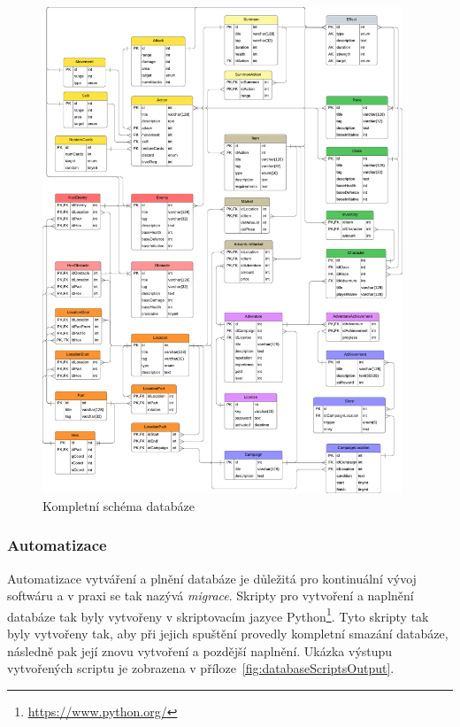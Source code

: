 \begin{figure}[H]
    \centering
    \includegraphics[width=0.96\textwidth]{../../shared/diagrams/dbScheme}
    \caption{Kompletní schéma databáze}
    \label{fig:db_scheme}
\end{figure}

\subsubsection*{Automatizace}
\label{subsubsec:implementation-technologies-database-automatization}
Automatizace vytváření a plnění databáze je důležitá pro kontinuální vývoj softwáru a v praxi se tak nazývá \textit{migrace}. Skripty pro vytvoření a naplnění databáze tak byly vytvořeny v skriptovacím jazyce Python\footnote{\href{https://www.python.org/}{https://www.python.org/}}. Tyto skripty tak byly vytvořeny tak, aby při jejich spuštění provedly kompletní smazání databáze, následně pak její znovu vytvoření a pozdější naplnění. Ukázka výstupu vytvořených scriptu je zobrazena v příloze~\ref{fig:databaseScriptsOutput}.

